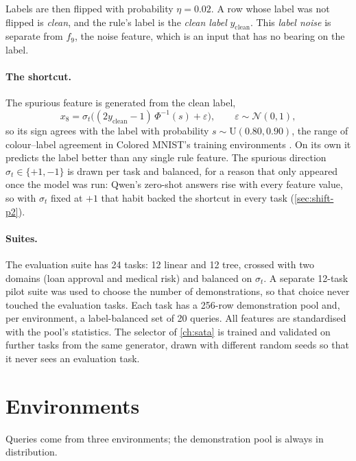 Labels are then flipped with probability $\eta = 0.02$. A row whose label was not flipped is \emph{clean}, and the rule's label is the \emph{clean label} $y_{\mathrm{clean}}$. This \emph{label noise} is separate from $f_9$, the noise feature, which is an input that has no bearing on the label.

\paragraph{The shortcut.}
The spurious feature is generated from the clean label,
\[
  x_8 = \sigma_t\big((2y_{\mathrm{clean}} - 1)\,\Phi^{-1}(s) + \varepsilon\big), \qquad \varepsilon \sim \mathcal{N}(0,1),
\]
so its sign agrees with the label with probability $s \sim \mathrm{U}(0.80, 0.90)$, the range of colour--label agreement in Colored MNIST's training environments \citep{arjovsky2019invariant}.
On its own it predicts the label better than any single rule feature.
The spurious direction $\sigma_t \in \{+1, -1\}$ is drawn per task and balanced, for a reason that only appeared once the model was run: Qwen's zero-shot answers rise with every feature value, so with $\sigma_t$ fixed at $+1$ that habit backed the shortcut in every task (\autoref{sec:shift-p2}).

\paragraph{Suites.}
The evaluation suite has 24 tasks: 12 linear and 12 tree, crossed with two domains (loan approval and medical risk) and balanced on $\sigma_t$.
A separate 12-task pilot suite was used to choose the number of demonstrations, so that choice never touched the evaluation tasks.
Each task has a 256-row demonstration pool and, per environment, a label-balanced set of 20 queries.
All features are standardised with the pool's statistics.
The selector of \autoref{ch:sata} is trained and validated on further tasks from the same generator, drawn with different random seeds so that it never sees an evaluation task.

\section{Environments}
\label{sec:environments}

Queries come from three environments; the demonstration pool is always in distribution.

